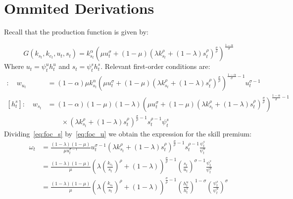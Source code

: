 \documentclass[12pt]{article}
\begin{document}




\pagebreak{}

\appendix

\section{Ommited Derivations}\label{sec:derivations}
Recall that the production function is given by:

\begin{equation}\label{eq:prod}
 G(k_{s_t}, k_{e_t}, u_t, s_t) = k_{s_t}^\alpha\left( \mu u_t^\sigma + (1-\mu)\left(\lambda k_{s_t}^\rho + (1-\lambda)s_t^\rho\right)^\frac{\sigma}{\rho}\right)^\frac{1-\alpha}{\sigma}
\end{equation}
Where $u_t = \psi^u_t h^u_t$ and $s_t = \psi^s_t h^s_t$. Relevant first-order conditions are:
\begin{align}
 [h^u_t]:\quad w_{u_t} &= (1-\alpha) \mu k_{s_t}^\alpha\left( \mu u_t^\sigma + (1-\mu)\left(\lambda k_{s_t}^\rho + (1-\lambda)s_t^\rho\right)^\frac{\sigma}{\rho}\right)^{\frac{1-\alpha}{\sigma}-1} u_t^{\sigma-1} \label{eq:foc_u}\\
 [h^s_t]:\quad w_{s_t} &= (1-\alpha) (1-\mu)(1-\lambda) \left( \mu u_t^\sigma + (1-\mu)\left(\lambda k_{s_t}^\rho +(1-\lambda)s_t^\rho\right)^\frac{\sigma}{\rho}\right)^{\frac{1-\alpha}{\sigma}-1} \nonumber \\ 
 & \qquad \times \left(\lambda k_{s_t}^\rho + (1-\lambda)s_t^\rho\right)^{\frac{\sigma}{\rho}-1} s_t^{\rho-1} \psi^s_t\label{eq:foc_s}
\end{align}
Dividing~\eqref{eq:foc_s} by~\eqref{eq:foc_u} we obtain the expression for the skill premium:
\begin{align}
 \omega_t &= \frac{(1-\lambda)(1-\mu)}{\mu u_t^{\sigma-1}}u_t^{\sigma-1}(\lambda k_{s_t}^\rho + (1-\lambda)s_t^\rho)^{\frac{\sigma}{\rho}-1}s_t^{\rho-1}\frac{\psi^s_t}{\psi^u_t}\nonumber\\
 &= \frac{(1-\lambda)(1-\mu)}{\mu}\left(\lambda \left(\frac{k_{s_t}}{s_t}\right)^\rho + (1-\lambda)\right)^{\frac{\sigma}{\rho}-1}\left(\frac{s_t}{u_t}\right)^{\sigma-1}\frac{\psi^s_t}{\psi^u_t}\nonumber\\
 &= \frac{(1-\lambda)(1-\mu)}{\mu}\left(\lambda \left(\frac{k_{s_t}}{s_t}\right)^\rho + (1-\lambda)\right)^{\frac{\sigma}{\rho}-1}\left(\frac{h^u_t}{h^s_t}\right)^{1 - \sigma}\left(\frac{\psi^s_t}{\psi^u_t}\right)^\sigma \label{sk_prem}
\end{align}
\end{document}
